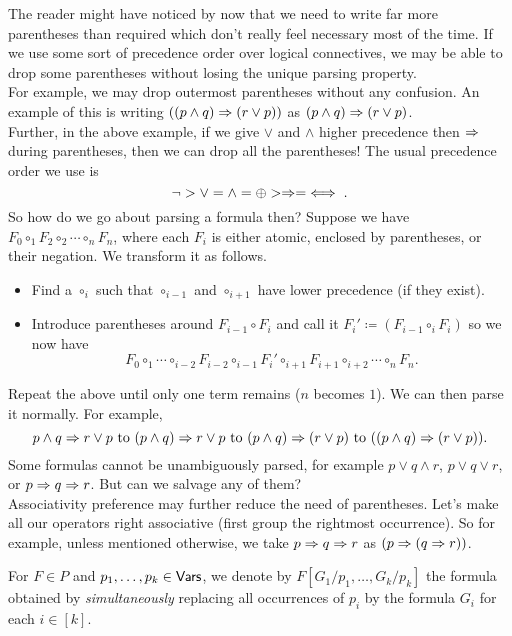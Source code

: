 The reader might have noticed by now that we need to write far more parentheses than required which don't really feel necessary most of the time. If we use some sort of precedence order over logical connectives, we may be able to drop some parentheses without losing the unique parsing property.\\
For example, we may drop outermost parentheses without any confusion. An example of this is writing $((p \wedge q)\Rightarrow (r \vee p))$ as $(p \wedge q)\Rightarrow (r \vee p)$.\\
Further, in the above example, if we give $\vee$ and $\wedge$ higher precedence then $\Rightarrow$ during parentheses, then we can drop all the parentheses! The usual precedence order we use is
\[ \neg > \vee = \wedge = \oplus > \Rightarrow = \iff. \]
So how do we go about parsing a formula then? Suppose we have $F_0\circ_1 F_2\circ_2 \cdots\circ_n F_n$, where each $F_i$ is either atomic, enclosed by parentheses, or their negation. We transform it as follows.
\begin{itemize}
	\item Find a $\circ_i$ such that $\circ_{i-1}$ and $\circ_{i+1}$ have lower precedence (if they exist).
	\item Introduce parentheses around $F_{i-1}\circ F_i$ and call it $F_i'\coloneqq (F_{i-1}\circ_i F_i)$ so we now have
	\[ F_0 \circ_1 \cdots \circ_{i-2} F_{i-2} \circ_{i-1} F_i' \circ_{i+1} F_{i+1} \circ_{i+2} \cdots \circ_n F_n. \]
\end{itemize}
Repeat the above until only one term remains ($n$ becomes $1$). We can then parse it normally. For example,
\[ p \wedge q \Rightarrow r \vee p \text{ to } (p\wedge q)\Rightarrow r\vee p \text{ to } (p\wedge q)\Rightarrow (r\vee p) \text{ to } ((p\wedge q)\Rightarrow (r\vee p)). \]
Some formulas cannot be unambiguously parsed, for example $p\vee q\wedge r$, $p \vee q \vee r$, or $p\Rightarrow q\Rightarrow r$. But can we salvage any of them?\\
Associativity preference may further reduce the need of parentheses. Let's make all our operators right associative (first group the rightmost occurrence). So for example, unless mentioned otherwise, we take $p\Rightarrow q\Rightarrow r$ as $(p\Rightarrow (q\Rightarrow r))$.

\begin{definition}
For $F\in P$ and $p_1,\ldots,p_k\in\mathsf{Vars}$, we denote by $F[G_1/p_1,\ldots,G_k/p_k]$ the formula obtained by \textit{simultaneously} replacing all occurrences of $p_i$ by the formula $G_i$ for each $i\in[k]$. 
\end{definition}

